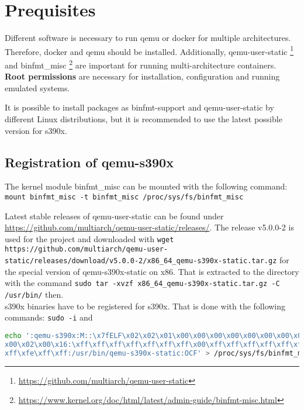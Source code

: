 \chapter{Prequisites}\label{ch:prequisites}


Different software is necessary to run qemu or docker for multiple architectures. Therefore, docker and qemu should be installed. Additionally, qemu-user-static \footnote{\url{https://github.com/multiarch/qemu-user-static}} and binfmt\_misc \footnote{\url{https://www.kernel.org/doc/html/latest/admin-guide/binfmt-misc.html}} are important for running multi-architecture containers. \\
\textbf{Root permissions} are necessary for installation, configuration and running emulated systems.

It is possible to install packages as binfmt-support and qemu-user-static by different Linux distributions, but it is recommended to use the latest possible version for s390x. \\

\section{Registration of qemu-s390x}

The kernel module binfmt\_misc can be mounted with the following command: \\
\lstinline!mount binfmt_misc -t binfmt_misc /proc/sys/fs/binfmt_misc!

Latest stable releases of qemu-user-static can be found under \url{https://github.com/multiarch/qemu-user-static/releases/}. The release v5.0.0-2 is used for the project and downloaded with \lstinline!wget https://github.com/multiarch/qemu-user-static/releases/download/v5.0.0-2/x86_64_qemu-s390x-static.tar.gz! for the special version of qemu-s390x-static on x86. That is extracted to the directory  with the command \lstinline!sudo tar -xvzf x86_64_qemu-s390x-static.tar.gz -C /usr/bin/! then. \\

s390x binaries have to be registered for s390x. That is done with the following commands: \lstinline!sudo -i! and \begin{lstlisting}[language=bash, numberstyle=\myHexNumber, caption={Register s390x binaries},captionpos=b]
echo ':qemu-s390x:M::\x7fELF\x02\x02\x01\x00\x00\x00\x00\x00\x00\x00\x00\x00\ 
x00\x02\x00\x16:\xff\xff\xff\xff\xff\xff\xff\x00\xff\xff\xff\xff\xff\xff\xff\xff\
xff\xfe\xff\xff:/usr/bin/qemu-s390x-static:OCF' > /proc/sys/fs/binfmt_misc/register
\end{lstlisting}

